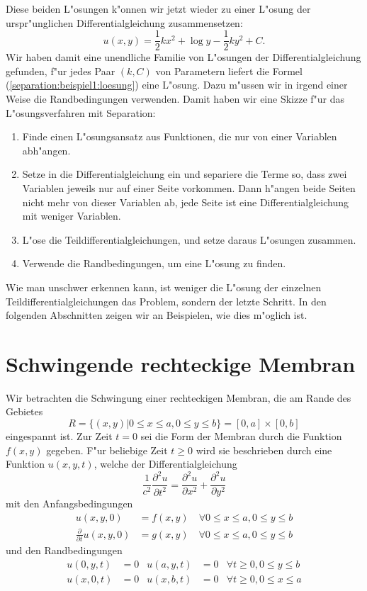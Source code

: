 Diese beiden L"osungen k"onnen wir jetzt wieder zu einer L"osung der
urspr"unglichen Differentialgleichung zusammensetzen:
\begin{equation}
u(x,y)=
\frac12kx^2+
\log y-\frac12ky^2+C.
\label{separation:beispiel1:loesung}
\end{equation}
Wir haben damit eine unendliche Familie von L"osungen der
Differentialgleichung gefunden, f"ur jedes Paar $(k,C)$ von
Parametern liefert die Formel (\ref{separation:beispiel1:loesung})
eine L"osung.
Dazu m"ussen wir in irgend einer Weise die Randbedingungen verwenden.
Damit haben wir eine Skizze f"ur das L"osungsverfahren mit Separation:
\begin{enumerate}
\item Finde einen L"osungsansatz aus Funktionen, die nur von einer
Variablen abh"angen.
\item Setze in die Differentialgleichung ein und separiere die Terme
so, dass zwei Variablen jeweils nur auf einer Seite vorkommen. Dann
h"angen beide Seiten nicht mehr von dieser Variablen ab, jede Seite
ist eine Differentialgleichung mit weniger Variablen.
\item L"ose die Teildifferentialgleichungen, und setze daraus 
L"osungen zusammen. 
\item Verwende die Randbedingungen, um eine L"osung zu finden.
\end{enumerate}
Wie man unschwer erkennen kann, ist weniger die L"osung der
einzelnen Teildifferentialgleichungen das Problem, sondern der letzte
Schritt. In den folgenden Abschnitten zeigen wir an Beispielen, wie
dies m"oglich ist.

\section{Schwingende rechteckige Membran}
Wir betrachten die Schwingung einer rechteckigen Membran, die am Rande
des Gebietes
\[
R=\{(x,y)|0\le x\le a,0\le y\le b\} =[0,a]\times[0,b]
\]
eingespannt ist. Zur Zeit $t=0$ sei die Form der Membran durch die
Funktion $f(x,y)$ gegeben.
F"ur beliebige Zeit $t\ge 0$ wird sie beschrieben durch eine Funktion $u(x,y,t)$,
welche der Differentialgleichung
\[
\frac1{c^2}\frac{\partial^2u}{\partial t^2}=\frac{\partial^2u}{\partial x^2}+\frac{\partial^2u}{\partial y^2}
\]
mit den Anfangsbedingungen
\begin{align*}
u(x,y,0)&=f(x,y)\quad\forall 0\le x\le a,0\le y\le b
\\
\frac{\partial}{\partial t}u(x,y,0)&=g(x,y)\quad\forall 0\le x\le a,0\le y\le b
\end{align*}
und den Randbedingungen
\begin{align*}
u(0,y,t)&=0&u(a,y,t)&=0&\forall t\ge 0,0\le y\le b\\
u(x,0,t)&=0&u(x,b,t)&=0&\forall t\ge 0,0\le x\le a
\end{align*}

